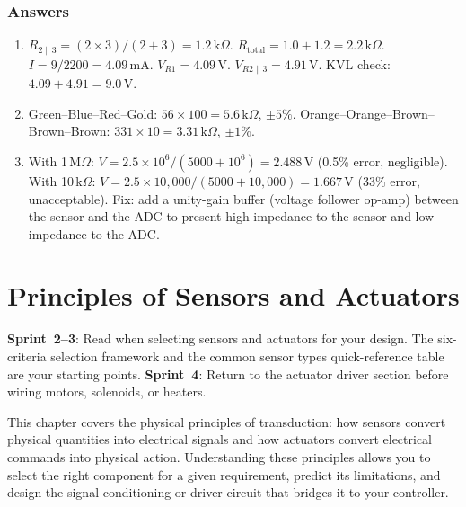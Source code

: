 \documentclass[11pt,letterpaper,twoside,openany]{book}
\begin{document}
\subsection{Answers}
\begin{enumerate}[leftmargin=1.5em]
\item $R_{2\|3} = (2 \times 3)/(2+3) = 1.2\,\text{k}\Omega$. $R_{\text{total}} = 1.0 + 1.2 = 2.2\,\text{k}\Omega$. $I = 9/2200 = 4.09$\,mA. $V_{R1} = 4.09$\,V. $V_{R2\|3} = 4.91$\,V. KVL check: $4.09 + 4.91 = 9.0$\,V.
\item Green--Blue--Red--Gold: $56 \times 100 = 5.6\,\text{k}\Omega$, $\pm 5\%$. Orange--Orange--Brown--Brown--Brown: $331 \times 10 = 3.31\,\text{k}\Omega$, $\pm 1\%$.
\item With 1\,M$\Omega$: $V = 2.5 \times 10^6/(5000 + 10^6) = 2.488$\,V (0.5\% error, negligible). With 10\,k$\Omega$: $V = 2.5 \times 10{,}000/(5000 + 10{,}000) = 1.667$\,V (33\% error, unacceptable). Fix: add a unity-gain buffer (voltage follower op-amp) between the sensor and the ADC to present high impedance to the sensor and low impedance to the ADC.
\end{enumerate}




\chapter{Principles of Sensors and Actuators}\label{ch:sensors}

\begin{tipbox}
\textbf{Sprint~2--3}: Read when selecting sensors and actuators for your design. The six-criteria selection framework and the common sensor types quick-reference table are your starting points. \textbf{Sprint~4}: Return to the actuator driver section before wiring motors, solenoids, or heaters.
\end{tipbox}


\vspace{1em}

This chapter covers the physical principles of transduction: how sensors convert physical quantities into electrical signals and how actuators convert electrical commands into physical action. Understanding these principles allows you to select the right component for a given requirement, predict its limitations, and design the signal conditioning or driver circuit that bridges it to your controller.
\end{document}
